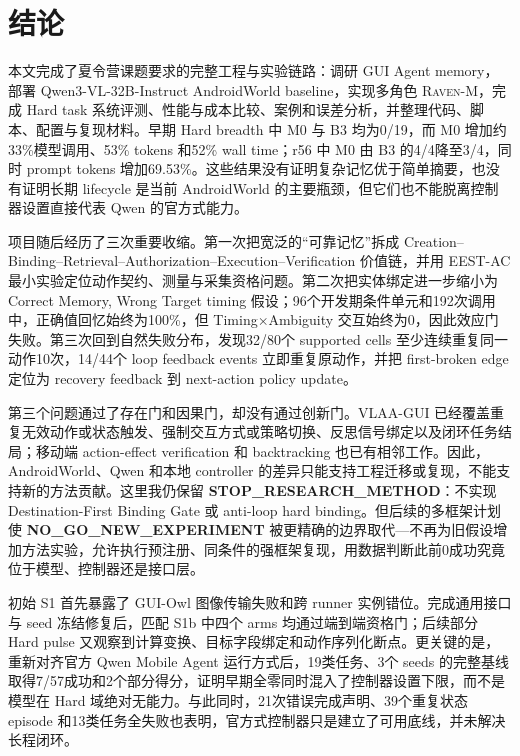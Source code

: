 \documentclass[12pt,a4paper]{ctexart}
\newcommand{\ravenm}{\textsc{Raven-M}}
\begin{document}
\section{结论}

本文完成了夏令营课题要求的完整工程与实验链路：调研 GUI Agent memory，部署 Qwen3-VL-32B-Instruct AndroidWorld baseline，实现多角色 \ravenm{}，完成 Hard task 系统评测、性能与成本比较、案例和误差分析，并整理代码、脚本、配置与复现材料。早期 Hard breadth 中 M0 与 B3 均为0/19，而 M0 增加约33\%模型调用、53\% tokens 和52\% wall time；r56 中 M0 由 B3 的4/4降至3/4，同时 prompt tokens 增加69.53\%。这些结果没有证明复杂记忆优于简单摘要，也没有证明长期 lifecycle 是当前 AndroidWorld 的主要瓶颈，但它们也不能脱离控制器设置直接代表 Qwen 的官方式能力。

项目随后经历了三次重要收缩。第一次把宽泛的“可靠记忆”拆成 Creation--Binding--Retrieval--Authorization--Execution--Verification 价值链，并用 EEST-AC 最小实验定位动作契约、测量与采集资格问题。第二次把实体绑定进一步缩小为 Correct Memory, Wrong Target timing 假设；96个开发期条件单元和192次调用中，正确值回忆始终为100\%，但 Timing$\times$Ambiguity 交互始终为0，因此效应门失败。第三次回到自然失败分布，发现32/80个 supported cells 至少连续重复同一动作10次，14/44个 loop feedback events 立即重复原动作，并把 first-broken edge 定位为 recovery feedback 到 next-action policy update。

第三个问题通过了存在门和因果门，却没有通过创新门。VLAA-GUI 已经覆盖重复无效动作或状态触发、强制交互方式或策略切换、反思信号绑定以及闭环任务结局；移动端 action-effect verification 和 backtracking 也已有相邻工作。因此，AndroidWorld、Qwen 和本地 controller 的差异只能支持工程迁移或复现，不能支持新的方法贡献。这里我仍保留 \textbf{STOP\_RESEARCH\_METHOD}：不实现 Destination-First Binding Gate 或 anti-loop hard binding。但后续的多框架计划使 \textbf{NO\_GO\_NEW\_EXPERIMENT} 被更精确的边界取代---不再为旧假设增加方法实验，允许执行预注册、同条件的强框架复现，用数据判断此前0成功究竟位于模型、控制器还是接口层。

初始 S1 首先暴露了 GUI-Owl 图像传输失败和跨 runner 实例错位。完成通用接口与 seed 冻结修复后，匹配 S1b 中四个 arms 均通过端到端资格门；后续部分 Hard pulse 又观察到计算变换、目标字段绑定和动作序列化断点。更关键的是，重新对齐官方 Qwen Mobile Agent 运行方式后，19类任务、3个 seeds 的完整基线取得7/57成功和2个部分得分，证明早期全零同时混入了控制器设置下限，而不是模型在 Hard 域绝对无能力。与此同时，21次错误完成声明、39个重复状态 episode 和13类任务全失败也表明，官方式控制器只是建立了可用底线，并未解决长程闭环。
\end{document}
